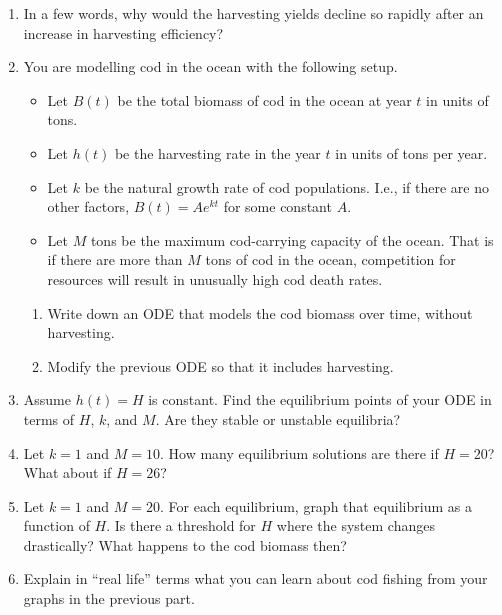 \begin{enumerate}
\begin{enumerate}
\item In a few words, why would the harvesting yields decline so rapidly after an increase in harvesting efficiency?


\item You are modelling cod in the ocean with the following setup.
\begin{itemize}
 	\item Let $B(t)$ be the total biomass of cod in the ocean at year $t$ in units of tons.

	\item 
	Let $h(t)$ be the harvesting rate in the year $t$ in units of tons per year.
	\item Let $k$ be the natural growth rate of cod populations. I.e., if there are no other factors, $B(t)=Ae^{kt}$ for some constant $A$. 
	
	\item Let $M$ tons be the maximum cod-carrying capacity of the ocean. That is if there are more than $M$ tons of cod in the ocean, competition for resources will result in unusually high cod death rates.
\end{itemize}

\begin{enumerate}
    \item Write down an ODE that models the cod biomass over time, without harvesting.
    \item Modify the previous ODE so that it includes harvesting.
\end{enumerate}

\item  Assume $h(t)=H$ is constant. Find the equilibrium points of your ODE in terms of $H$, $k$, and $M$. Are they stable or unstable equilibria?

\item Let $k=1$ and $M=10$. How many equilibrium solutions are there if $H=20$? What about if $H=26$?

\item 
Let $k=1$ and $M=20$. For each equilibrium, graph that equilibrium as a function of $H$. Is there a threshold for $H$ where the system changes drastically? What happens to the cod biomass then?

\item Explain in ``real life'' terms what you can learn about cod fishing from your graphs in the previous part.

\end{enumerate}


	

\end{enumerate}
